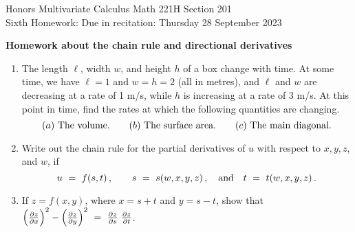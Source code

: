 \documentclass[12pt]{article}
\begin{document}
\LARGE 
\noindent
{\color{Maroon}Honors Multivariate Calculus \hfill Math 221H Section 201}\vspace{2pt}\\
\large
Sixth Homework:\hfill 
Due in recitation: Thursday 28 September 2023\vspace{2pt}

\normalsize
    {\bf {\color{Maroon}Homework about the chain rule and directional derivatives}}\vspace{2pt}

\begin{enumerate}


  
\item The length $\ell$, width $w$, and height $h$ of a box change with time.
      At some time, we have $\ell=1$ and $w=h=2$ (all in metres), and $\ell$ and $w$ are decreasing at a rate of 1 m/s, while $h$ is
      increasing at a rate of 3 m/s.
      At this point in time, find the rates at which the following quantities are changing.\vspace{-2pt}
      \[
       (a)\ \mbox{The volume.}\qquad
       (b)\ \mbox{The surface area.}\qquad
       (c)\ \mbox{The main diagonal.}\vspace{-2pt}
      \]      
  


  
\item  Write out the chain rule for the partial derivatives of $u$ with respect to $x,y,z$, and $w$, if\vspace{-2pt}
      \[
      u\ =\ f(s,t)\,,\qquad
      s\ =\ s(w,x,y,z)\,,\quad\mbox{and}\quad
      t\ =\ t(w,x,y,z)\,.\vspace{-2pt}
      \]

  
\item  If $z=f(x,y)$, where $x=s+t$ and $y=s-t$, show that
  $   \Bigl(\frac{\partial z}{\partial x}\Bigr)^2  - 
   \Bigl(\frac{\partial z}{\partial y}\Bigr)^2\ =\
   \frac{\partial z}{\partial s}\ 
   \frac{\partial z}{\partial t}$.\vspace{-2pt}


\end{enumerate}
\end{document}
